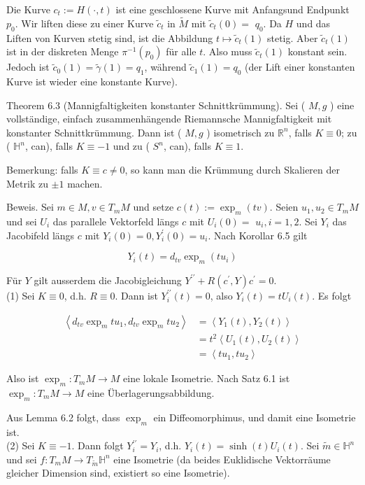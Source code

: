 \documentclass[10pt, letterpaper]{article}
\begin{document}
Die Kurve $c_{t}:=H(\cdot, t)$ ist eine geschlossene Kurve mit Anfangsund Endpunkt $p_{0}$. Wir liften diese zu einer Kurve $\tilde{c}_{t}$ in $\tilde{M}$ mit $\tilde{c}_{t}(0)=$ $q_{0}$. Da $H$ und das Liften von Kurven stetig sind, ist die Abbildung $t \mapsto \tilde{c}_{t}(1)$ stetig. Aber $\tilde{c}_{t}(1)$ ist in der diskreten Menge $\pi^{-1}\left(p_{0}\right)$ für alle $t$. Also muss $\tilde{c}_{t}(1)$ konstant sein. Jedoch ist $\tilde{c}_{0}(1)=\tilde{\gamma}(1)=q_{1}$, während $\tilde{c}_{1}(1)=q_{0}$ (der Lift einer konstanten Kurve ist wieder eine konstante Kurve).

Theorem 6.3 (Mannigfaltigkeiten konstanter Schnittkrümmung). Sei ( $M, g$ ) eine vollständige, einfach zusammenhängende Riemannsche Mannigfaltigkeit mit konstanter Schnittkrümmung. Dann ist ( $M, g$ ) isometrisch zu $\mathbb{R}^{n}$, falls $K \equiv 0$; zu ( $\mathbb{H}^{n}$, can), falls $K \equiv-1$ und zu ( $S^{n}$, can), falls $K \equiv 1$.

Bemerkung: falls $K \equiv c \neq 0$, so kann man die Krümmung durch Skalieren der Metrik zu $\pm 1$ machen.

Beweis. Sei $m \in M, v \in T_{m} M$ und setze $c(t):=\exp _{m}(t v)$. Seien $u_{1}, u_{2} \in T_{m} M$ und sei $U_{i}$ das parallele Vektorfeld längs $c$ mit $U_{i}(0)=$ $u_{i}, i=1,2$. Sei $Y_{i}$ das Jacobifeld längs $c$ mit $Y_{i}(0)=0, Y_{i}^{\prime}(0)=u_{i}$. Nach Korollar 6.5 gilt

$$
Y_{i}(t)=d_{t v} \exp _{m}\left(t u_{i}\right)
$$

Für $Y$ gilt ausserdem die Jacobigleichung $Y^{\prime \prime}+R\left(c^{\prime}, Y\right) c^{\prime}=0$.\\
(1) Sei $K \equiv 0$, d.h. $R \equiv 0$. Dann ist $Y_{i}^{\prime \prime}(t)=0$, also $Y_{i}(t)=t U_{i}(t)$. Es folgt

$$
\begin{aligned}
\left\langle d_{t v} \exp _{m} t u_{1}, d_{t v} \exp _{m} t u_{2}\right\rangle & =\left\langle Y_{1}(t), Y_{2}(t)\right\rangle \\
& =t^{2}\left\langle U_{1}(t), U_{2}(t)\right\rangle \\
& =\left\langle t u_{1}, t u_{2}\right\rangle
\end{aligned}
$$

Also ist $\exp _{m}: T_{m} M \rightarrow M$ eine lokale Isometrie. Nach Satz 6.1 ist $\exp _{m}: T_{m} M \rightarrow M$ eine Überlagerungsabbildung.

Aus Lemma 6.2 folgt, dass $\exp _{m}$ ein Diffeomorphimus, und damit eine Isometrie ist.\\
(2) Sei $K \equiv-1$. Dann folgt $Y_{i}^{\prime \prime}=Y_{i}$, d.h. $Y_{i}(t)=\sinh (t) U_{i}(t)$. Sei $\tilde{m} \in \mathbb{H}^{n}$ und sei $f: T_{m} M \rightarrow T_{\tilde{m}} \mathbb{H}^{n}$ eine Isometrie (da beides Euklidische Vektorräume gleicher Dimension sind, existiert so eine Isometrie).
\end{document}
